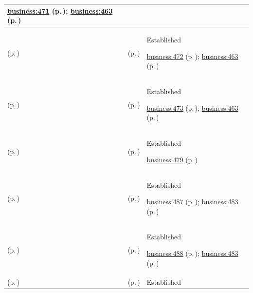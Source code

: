 \begin{longtable}{|>{\raggedright\arraybackslash}p{0.27\TableWidth}|>{\raggedright\arraybackslash}p{0.27\TableWidth}|>{\raggedright\arraybackslash}p{0.46\TableWidth}|}
 \hyperref[rad:business:465]{business:471} (p.\,\pageref{rad:business:465}); \hyperref[rad:business:463]{business:463} (p.\,\pageref{rad:business:463})\\\hline
\nameref{cap:bc-diagnostic-support-provision} (p.\,\pageref{cap:bc-diagnostic-support-provision}) & \nameref{cap:bc-diagnostic-report-management} (p.\,\pageref{cap:bc-diagnostic-report-management}) & Established

 \hyperref[rad:business:465]{business:472} (p.\,\pageref{rad:business:465}); \hyperref[rad:business:463]{business:463} (p.\,\pageref{rad:business:463})\\\hline
\nameref{cap:bc-diagnostic-support-provision} (p.\,\pageref{cap:bc-diagnostic-support-provision}) & \nameref{cap:bc-diagnostic-report-distribution} (p.\,\pageref{cap:bc-diagnostic-report-distribution}) & Established

 \hyperref[rad:business:465]{business:473} (p.\,\pageref{rad:business:465}); \hyperref[rad:business:463]{business:463} (p.\,\pageref{rad:business:463})\\\hline
\nameref{cap:bc-diagnostic-therapeutic-clinical-support-services} (p.\,\pageref{cap:bc-diagnostic-therapeutic-clinical-support-services}) & \nameref{cap:bc-medication-pharmacy-services} (p.\,\pageref{cap:bc-medication-pharmacy-services}) & Established

 \hyperref[rad:business:479]{business:479} (p.\,\pageref{rad:business:479})\\\hline
\nameref{cap:bc-medication-pharmacy-services} (p.\,\pageref{cap:bc-medication-pharmacy-services}) & \nameref{cap:bc-prescription-medication-dispensing} (p.\,\pageref{cap:bc-prescription-medication-dispensing}) & Established

 \hyperref[rad:business:485]{business:487} (p.\,\pageref{rad:business:485}); \hyperref[rad:business:483]{business:483} (p.\,\pageref{rad:business:483})\\\hline
\nameref{cap:bc-medication-pharmacy-services} (p.\,\pageref{cap:bc-medication-pharmacy-services}) & \nameref{cap:bc-non-prescription-medication-provision} (p.\,\pageref{cap:bc-non-prescription-medication-provision}) & Established

 \hyperref[rad:business:485]{business:488} (p.\,\pageref{rad:business:485}); \hyperref[rad:business:483]{business:483} (p.\,\pageref{rad:business:483})\\\hline
\nameref{cap:bc-medication-pharmacy-services} (p.\,\pageref{cap:bc-medication-pharmacy-services}) & \nameref{cap:bc-medication-advice} (p.\,\pageref{cap:bc-medication-advice}) & Established


\end{longtable}
